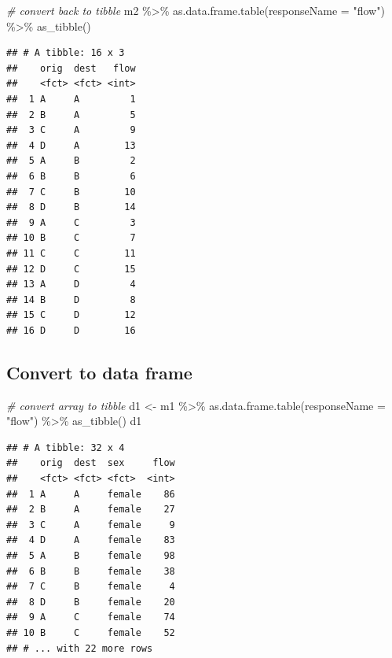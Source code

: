 \documentclass[
]{book}
\newenvironment{Shaded}{\begin{snugshade}}{\end{snugshade}}
\newcommand{\AttributeTok}[1]{\textcolor[rgb]{0.77,0.63,0.00}{#1}}
\newcommand{\CommentTok}[1]{\textcolor[rgb]{0.56,0.35,0.01}{\textit{#1}}}
\newcommand{\FunctionTok}[1]{\textcolor[rgb]{0.00,0.00,0.00}{#1}}
\newcommand{\NormalTok}[1]{#1}
\newcommand{\OtherTok}[1]{\textcolor[rgb]{0.56,0.35,0.01}{#1}}
\newcommand{\SpecialCharTok}[1]{\textcolor[rgb]{0.00,0.00,0.00}{#1}}
\newcommand{\StringTok}[1]{\textcolor[rgb]{0.31,0.60,0.02}{#1}}
\begin{document}
\begin{Shaded}
\begin{Highlighting}[]
\CommentTok{\# convert back to tibble}
\NormalTok{m2 }\SpecialCharTok{\%\textgreater{}\%}
  \FunctionTok{as.data.frame.table}\NormalTok{(}\AttributeTok{responseName =} \StringTok{"flow"}\NormalTok{) }\SpecialCharTok{\%\textgreater{}\%}
  \FunctionTok{as\_tibble}\NormalTok{()}
\end{Highlighting}
\end{Shaded}

\begin{verbatim}
## # A tibble: 16 x 3
##    orig  dest   flow
##    <fct> <fct> <int>
##  1 A     A         1
##  2 B     A         5
##  3 C     A         9
##  4 D     A        13
##  5 A     B         2
##  6 B     B         6
##  7 C     B        10
##  8 D     B        14
##  9 A     C         3
## 10 B     C         7
## 11 C     C        11
## 12 D     C        15
## 13 A     D         4
## 14 B     D         8
## 15 C     D        12
## 16 D     D        16
\end{verbatim}

\hypertarget{convert-to-data-frame-1}{%
\subsection{Convert to data frame}\label{convert-to-data-frame-1}}

\begin{Shaded}
\begin{Highlighting}[]
\CommentTok{\# convert array to tibble}
\NormalTok{d1 }\OtherTok{\textless{}{-}}\NormalTok{ m1 }\SpecialCharTok{\%\textgreater{}\%}
  \FunctionTok{as.data.frame.table}\NormalTok{(}\AttributeTok{responseName =} \StringTok{"flow"}\NormalTok{) }\SpecialCharTok{\%\textgreater{}\%}
  \FunctionTok{as\_tibble}\NormalTok{()}
\NormalTok{d1}
\end{Highlighting}
\end{Shaded}

\begin{verbatim}
## # A tibble: 32 x 4
##    orig  dest  sex     flow
##    <fct> <fct> <fct>  <int>
##  1 A     A     female    86
##  2 B     A     female    27
##  3 C     A     female     9
##  4 D     A     female    83
##  5 A     B     female    98
##  6 B     B     female    38
##  7 C     B     female     4
##  8 D     B     female    20
##  9 A     C     female    74
## 10 B     C     female    52
## # ... with 22 more rows
\end{verbatim}
\end{document}
